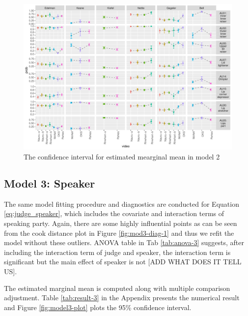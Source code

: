 \documentclass{monashthesis}
\begin{document}
\begin{figure}

{\centering \includegraphics[width=1\linewidth]{figures/model2-plot-1} 

}

\caption{The confidence interval for estimated mearginal mean in model 2}\label{fig:model2-plot}
\end{figure}

\newpage

\hypertarget{model-3-speaker-1}{%
\subsection{Model 3: Speaker}\label{model-3-speaker-1}}

The same model fitting procedure and diagnostics are conducted for Equation \ref{eq:judge_speaker}, which includes the covariate and interaction terms of speaking party. Again, there are some highly influential points as can be seen from the cook distance plot in Figure \ref{fig:mod3-diag-1} and thus we refit the model without these outliers. ANOVA table in Tab \ref{tab:anova-3} suggests, after including the interaction term of judge and speaker, the interaction term is significant but the main effect of speaker is not {[}ADD WHAT DOES IT TELL US{]}.

The estimated marginal mean is computed along with multiple comparison adjustment. Table \ref{tab:result-3} in the Appendix presents the numerical result and Figure \ref{fig:model3-plot} plots the 95\% confidence interval.
\end{document}
